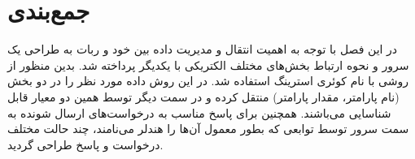 \section{جمع‌بندی}

در این فصل با توجه به اهمیت انتقال و مدیریت داده بین خود و ربات به طراحی یک سرور و نحوه ارتباط بخش‌های مختلف الکتریکی با یکدیگر پرداخته شد. بدین منظور از روشی با نام کوئری استرینگ استفاده شد. در این روش داده مورد نظر را در دو بخش (نام پارامتر، مقدار پارامتر) منتقل کرده و در سمت دیگر توسط همین دو معیار قابل شناسایی می‌باشند. همچنین برای پاسخ مناسب به درخواست‌های ارسال شونده به سمت سرور توسط توابعی که بطور معمول آن‌ها را هندلر می‌نامند، چند حالت مختلف درخواست و پاسخ طراحی گردید.